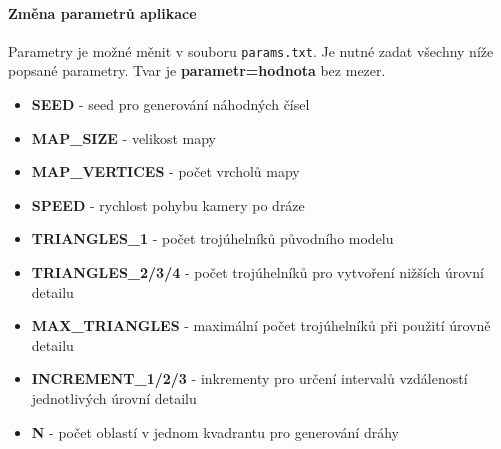 \paragraph{Změna parametrů aplikace}
Parametry je možné měnit v souboru \texttt{params.txt}. Je nutné zadat všechny níže popsané parametry. Tvar je \textbf{parametr=hodnota} bez mezer.
\begin{itemize} \itemsep1pt \parskip0pt 
\item[] \textbf{SEED} - seed pro generování náhodných čísel
\item[] \textbf{MAP\_SIZE} - velikost mapy
\item[] \textbf{MAP\_VERTICES} - počet vrcholů mapy
\item[] \textbf{SPEED} - rychlost pohybu kamery po dráze
\item[] \textbf{TRIANGLES\_1} - počet trojúhelníků původního modelu
\item[] \textbf{TRIANGLES\_2/3/4} - počet trojúhelníků pro vytvoření nižších úrovní detailu
\item[] \textbf{MAX\_TRIANGLES} - maximální počet trojúhelníků při použití úrovně detailu
\item[] \textbf{INCREMENT\_1/2/3} - inkrementy pro určení intervalů vzdáleností jednotlivých úrovní detailu
\item[] \textbf{N} - počet oblastí v jednom kvadrantu pro generování dráhy
\end{itemize}


